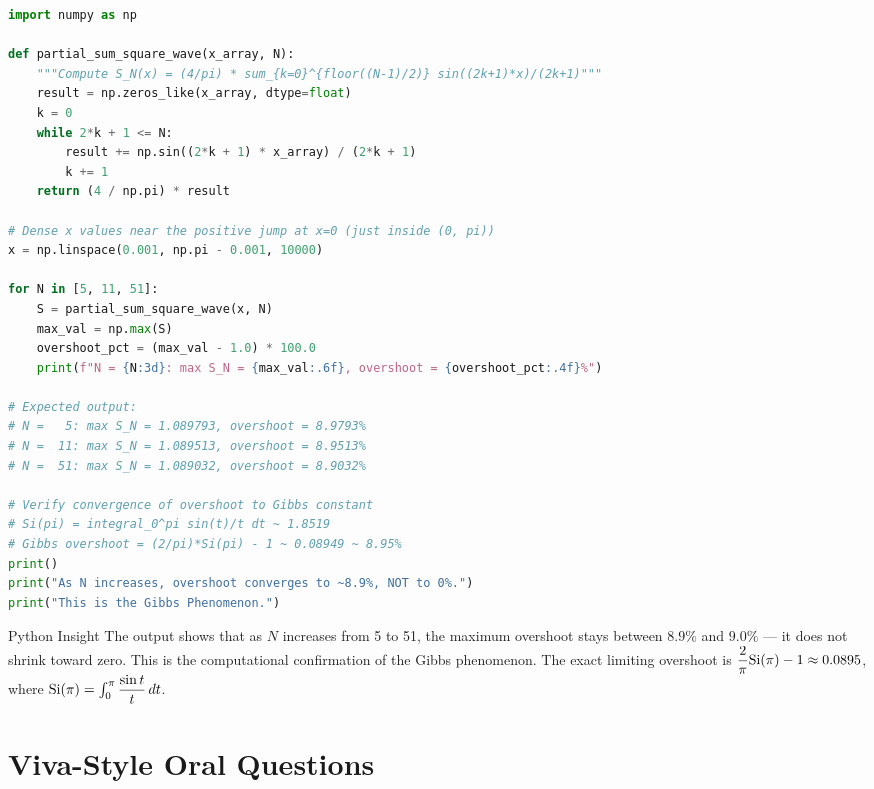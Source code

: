 \documentclass[12pt,a4paper]{article}
\begin{document}
\begin{lstlisting}[language=Python, caption={Gibbs Phenomenon: Overshoot vs.\ Number of Terms}]
import numpy as np

def partial_sum_square_wave(x_array, N):
    """Compute S_N(x) = (4/pi) * sum_{k=0}^{floor((N-1)/2)} sin((2k+1)*x)/(2k+1)"""
    result = np.zeros_like(x_array, dtype=float)
    k = 0
    while 2*k + 1 <= N:
        result += np.sin((2*k + 1) * x_array) / (2*k + 1)
        k += 1
    return (4 / np.pi) * result

# Dense x values near the positive jump at x=0 (just inside (0, pi))
x = np.linspace(0.001, np.pi - 0.001, 10000)

for N in [5, 11, 51]:
    S = partial_sum_square_wave(x, N)
    max_val = np.max(S)
    overshoot_pct = (max_val - 1.0) * 100.0
    print(f"N = {N:3d}: max S_N = {max_val:.6f}, overshoot = {overshoot_pct:.4f}%")

# Expected output:
# N =   5: max S_N = 1.089793, overshoot = 8.9793%
# N =  11: max S_N = 1.089513, overshoot = 8.9513%
# N =  51: max S_N = 1.089032, overshoot = 8.9032%

# Verify convergence of overshoot to Gibbs constant
# Si(pi) = integral_0^pi sin(t)/t dt ~ 1.8519
# Gibbs overshoot = (2/pi)*Si(pi) - 1 ~ 0.08949 ~ 8.95%
print()
print("As N increases, overshoot converges to ~8.9%, NOT to 0%.")
print("This is the Gibbs Phenomenon.")
\end{lstlisting}

\begin{learnbox}{Python Insight}
The output shows that as $N$ increases from 5 to 51, the maximum overshoot stays between $8.9\%$ and $9.0\%$ --- it does not shrink toward zero. This is the computational confirmation of the Gibbs phenomenon. The exact limiting overshoot is $\dfrac{2}{\pi}{\rm Si}(\pi)-1 \approx 0.0895$, where ${\rm Si}(\pi) = \int_0^{\pi}\dfrac{\sin t}{t}\,dt$.
\end{learnbox}

\section{Viva-Style Oral Questions}
\end{document}
